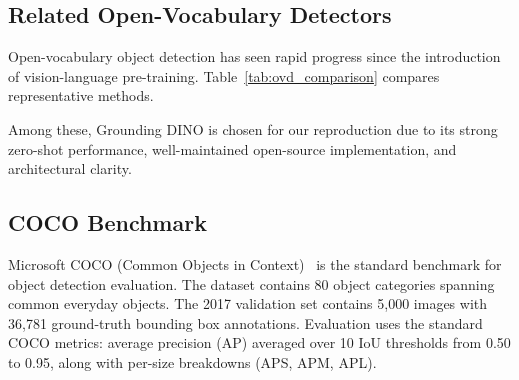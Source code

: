 \documentclass[10pt,journal,final,twocolumn]{IEEEtran}
\begin{document}
\subsection{Related Open-Vocabulary Detectors}

Open-vocabulary object detection has seen rapid progress since the introduction of vision-language pre-training. Table~\ref{tab:ovd_comparison} compares representative methods.

\begin{table}[H]
    \centering
    \caption{Comparison of Open-Vocabulary Object Detectors}
    \label{tab:ovd_comparison}
    \footnotesize
\end{table}

Among these, Grounding DINO is chosen for our reproduction due to its strong zero-shot performance, well-maintained open-source implementation, and architectural clarity.

\subsection{COCO Benchmark}

Microsoft COCO (Common Objects in Context)~\cite{Lin14} is the standard benchmark for object detection evaluation. The dataset contains 80 object categories spanning common everyday objects. The 2017 validation set contains 5,000 images with 36,781 ground-truth bounding box annotations. Evaluation uses the standard COCO metrics: average precision (AP) averaged over 10 IoU thresholds from 0.50 to 0.95, along with per-size breakdowns (APS, APM, APL).

\end{document}
